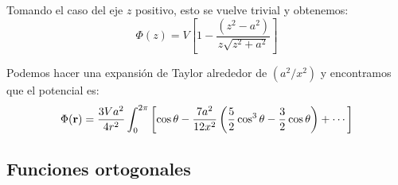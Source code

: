 \documentclass[]{article}
\numberwithin{equation}{section}
\begin{document}
Tomando el caso del eje \(z\) positivo, esto se vuelve trivial y obtenemos:
\begin{equation}
	\Phi(z) = V\left[ 1 - \frac{(z^2 - a^2)}{z\sqrt{z^2 + a^2}}\right]
\end{equation}

Podemos hacer una expansión de Taylor alrededor de \((a^2/x^2)\) y encontramos que el potencial es:
\begin{equation}
	\Phi(\mathbf{r}) = \frac{3 V a^2}{4 r^2}\int_{0}^{2\pi} \left[\cos\theta - \frac{7 a^2}{12 x^2}\left(\frac{5}{2}\cos^3\theta - \frac{3}{2}\cos\theta \right) + \cdots\right]
\end{equation}

\subsection{Funciones ortogonales}
\end{document}

